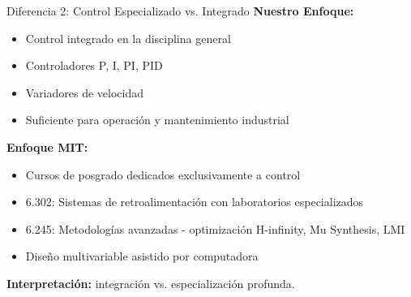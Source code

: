 \documentclass[aspectratio=43]{beamer}
\begin{document}
  \begin{frame}{Diferencia 2: Control Especializado vs. Integrado}
  \textbf{Nuestro Enfoque:}
  \begin{itemize}
    \small
    \item Control integrado en la disciplina general
    \item Controladores P, I, PI, PID
    \item Variadores de velocidad
    \item Suficiente para operación y mantenimiento industrial
  \end{itemize}
  
  \pause
  
  \textbf{Enfoque MIT:}
  \begin{itemize}
    \small
    \item Cursos de posgrado dedicados exclusivamente a control
    \item 6.302: Sistemas de retroalimentación con laboratorios especializados
    \item 6.245: Metodologías avanzadas - optimización H-infinity, Mu Synthesis, LMI
    \item Diseño multivariable asistido por computadora
  \end{itemize}
  
  \pause
  {\small 
    \textbf{Interpretación:} integración vs. especialización profunda.
  }

  \end{frame}
  
\end{document}
